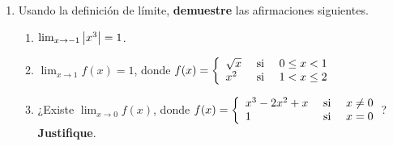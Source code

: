 \documentclass[12pt]{article}
\begin{document}
\begin{enumerate}
    \item Usando la definición de límite, \textbf{demuestre} las afirmaciones siguientes.
    \begin{enumerate}
        \item $\lim_{x\rightarrow-1}\left| x^3 \right|=1$.
        \item $\lim_{x\rightarrow1}f(x)=1$, donde $f(x)=\left\{\begin{array}{lcr}
            \sqrt{x} & \textup{ si } & 0\leq x<1\\
            x^2 & \textup{ si } & 1 <x\leq 2 \\
        \end{array} \right.$
        \item ¿Existe $\lim_{x\rightarrow0}f(x)$, donde $f(x)=\left\{\begin{array}{lcr}
            x^3-2x^2+x & \textup{ si } & x\neq0 \\
            1 & \textup{ si } & x=0 \\
        \end{array} \right.$? \textbf{Justifique}.
    \end{enumerate}


\end{enumerate}
\end{document}
